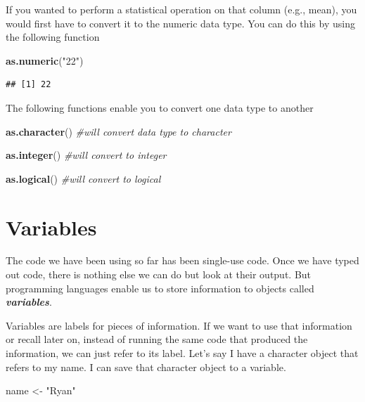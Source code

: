\documentclass[
]{book}
\newenvironment{Shaded}{\begin{snugshade}}{\end{snugshade}}
\newcommand{\CommentTok}[1]{\textcolor[rgb]{0.56,0.35,0.01}{\textit{#1}}}
\newcommand{\FunctionTok}[1]{\textcolor[rgb]{0.13,0.29,0.53}{\textbf{#1}}}
\newcommand{\NormalTok}[1]{#1}
\newcommand{\OtherTok}[1]{\textcolor[rgb]{0.56,0.35,0.01}{#1}}
\newcommand{\StringTok}[1]{\textcolor[rgb]{0.31,0.60,0.02}{#1}}
\begin{document}
If you wanted to perform a statistical operation on that column (e.g., mean), you would first have to convert it to the numeric data type. You can do this by using the following function

\begin{Shaded}
\begin{Highlighting}[]
\FunctionTok{as.numeric}\NormalTok{(}\StringTok{"22"}\NormalTok{)}
\end{Highlighting}
\end{Shaded}

\begin{verbatim}
## [1] 22
\end{verbatim}

The following functions enable you to convert one data type to another

\begin{Shaded}
\begin{Highlighting}[]
\FunctionTok{as.character}\NormalTok{() }\CommentTok{\#will convert data type to character}

\FunctionTok{as.integer}\NormalTok{() }\CommentTok{\#will convert to integer}

\FunctionTok{as.logical}\NormalTok{() }\CommentTok{\#will convert to logical}
\end{Highlighting}
\end{Shaded}

\hypertarget{variables}{%
\section{Variables}\label{variables}}

The code we have been using so far has been single-use code. Once we have typed out code, there is nothing else we can do but look at their output. But programming languages enable us to store information to objects called \textbf{\emph{variables}}.

Variables are labels for pieces of information. If we want to use that information or recall later on, instead of running the same code that produced the information, we can just refer to its label. Let's say I have a character object that refers to my name. I can save that character object to a variable.

\begin{Shaded}
\begin{Highlighting}[]
\NormalTok{name }\OtherTok{\textless{}{-}} \StringTok{"Ryan"}
\end{Highlighting}
\end{Shaded}
\end{document}
